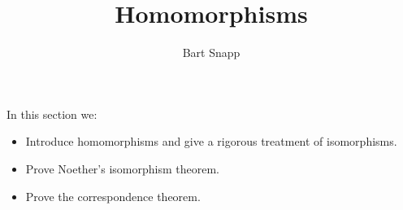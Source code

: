 \documentclass{ximera}
\author{Bart Snapp}
\title{Homomorphisms}
\begin{document}
\begin{abstract}
\end{abstract}
\maketitle
In this section we:

\begin{itemize}
\item Introduce homomorphisms and give a rigorous treatment of
  isomorphisms.
\item Prove Noether's isomorphism theorem.
\item Prove the correspondence theorem.
\end{itemize}
\end{document}
